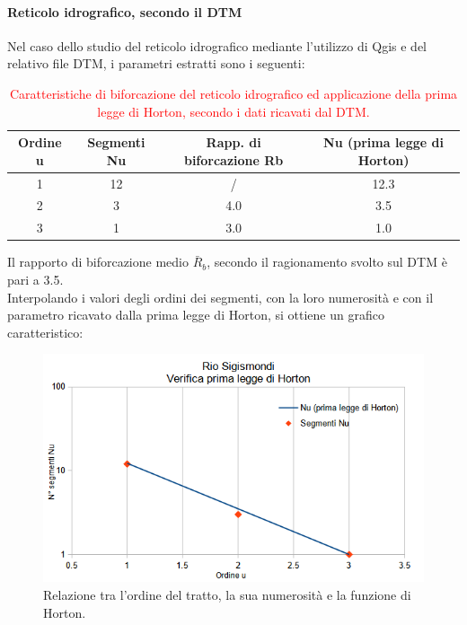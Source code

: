 \paragraph{Reticolo idrografico, secondo il DTM} Nel caso dello studio del reticolo idrografico mediante l'utilizzo di Qgis e del relativo file DTM, i parametri estratti sono i seguenti:
\begin{table}[H] \centering
    \caption{\textcolor{red}{Caratteristiche di biforcazione del reticolo idrografico ed applicazione della prima legge di Horton, secondo i dati ricavati dal DTM.}}
    \label{tab:rapp_biforcazione_2_horton}
    \begin{tabular}{ cccc }
\toprule
    Ordine u & Segmenti Nu & Rapp. di biforcazione Rb & Nu (prima legge di Horton) \\
\midrule    
    1        & 12          &   /        & 12.3                        \\
    2        & 3           & 4.0       & 3.5                        \\
    3        & 1           & 3.0      & 1.0                       \\
\bottomrule    
\end{tabular}
\end{table}

\noindent Il rapporto di biforcazione medio $\bar{R}_b$, secondo il ragionamento svolto sul DTM è pari a \num{3.5}.\\
Interpolando i valori degli ordini dei segmenti, con la loro numerosità e con il parametro ricavato dalla prima legge di Horton, si ottiene un grafico caratteristico:
\begin{figure}[H]\centering
    \includegraphics[scale=.75]{immagini/legge_horton_qgis.png}
    \caption{Relazione tra l'ordine del tratto, la sua numerosità e la funzione di Horton.}
    \label{legge_horton_qgis}
\end{figure}

